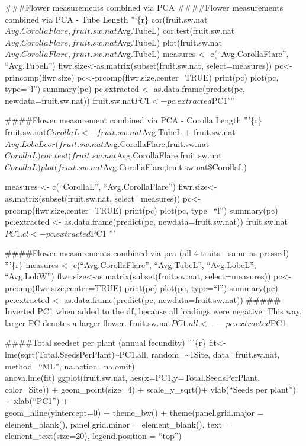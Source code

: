 \documentclass[]{article}
\begin{document}
\#\#\#Flower measurements combined via PCA \#\#\#\#Flower measurements
combined via PCA - Tube Length ''`\{r\}
cor(fruit.sw.nat\(Avg.CorollaFlare,fruit.sw.nat\)Avg.TubeL)
cor.test(fruit.sw.nat\(Avg.CorollaFlare,fruit.sw.nat\)Avg.TubeL)
plot(fruit.sw.nat\(Avg.CorollaFlare,fruit.sw.nat\)Avg.TubeL) measures
\textless{}- c(``Avg.CorollaFlare'', ``Avg.TubeL'')
flwr.size\textless{}-as.matrix(subset(fruit.sw.nat, select=measures))
pc\textless{}-princomp(flwr.size)
pc\textless{}-prcomp(flwr.size,center=TRUE) print(pc) plot(pc,
type=``l'') summary(pc) pc.extracted \textless{}-
as.data.frame(predict(pc, newdata=fruit.sw.nat))
fruit.sw.nat\(PC1 <- pc.extracted\)PC1'''

\#\#\#\#Flower measurement combined via PCA - Corolla Length '''\{r\}
fruit.sw.nat\(CorollaL <- fruit.sw.nat\)Avg.TubeL +
fruit.sw.nat\(Avg.LobeL cor(fruit.sw.nat\)Avg.CorollaFlare,fruit.sw.nat\(CorollaL) cor.test(fruit.sw.nat\)Avg.CorollaFlare,fruit.sw.nat\(CorollaL) plot(fruit.sw.nat\)Avg.CorollaFlare,fruit.sw.nat\$CorollaL)

measures \textless{}- c(``CorollaL'', ``Avg.CorollaFlare'')
flwr.size\textless{}-as.matrix(subset(fruit.sw.nat, select=measures))
pc\textless{}-prcomp(flwr.size,center=TRUE) print(pc) plot(pc,
type=``l'') summary(pc) pc.extracted \textless{}-
as.data.frame(predict(pc, newdata=fruit.sw.nat))
fruit.sw.nat\(PC1.cl <- pc.extracted\)PC1 '''

\#\#\#\#Flower measurements combined via pca (all 4 traits - same as
pressed) '''\{r\} measures \textless{}- c(``Avg.CorollaFlare'',
``Avg.TubeL'', ``Avg.LobeL'', ``Avg.LobW'')
flwr.size\textless{}-as.matrix(subset(fruit.sw.nat, select=measures))
pc\textless{}-prcomp(flwr.size,center=TRUE) print(pc) plot(pc,
type=``l'') summary(pc) pc.extracted \textless{}-
as.data.frame(predict(pc, newdata=fruit.sw.nat)) \#\#\#\#\# Inverted PC1
when added to the df, because all loadings were negative. This way,
larger PC denotes a larger flower.
fruit.sw.nat\(PC1.all <- -pc.extracted\)PC1

\#\#\#\#Total seedset per plant (annual fecundity) '''\{r\}
fit\textless{}-lme(sqrt(Total.SeedsPerPlant)\textasciitilde{}PC1.all,
random=\textasciitilde{}1\textbar{}Site, data=fruit.sw.nat,
method=``ML'', na.action=na.omit)\\
anova.lme(fit) ggplot(fruit.sw.nat, aes(x=PC1,y=Total.SeedsPerPlant,
color=Site)) + geom\_point(size=4) + scale\_y\_sqrt()+ ylab(``Seeds per
plant'') + xlab(``PC1'') +\\
geom\_hline(yintercept=0) + theme\_bw() + theme(panel.grid.major =
element\_blank(), panel.grid.minor = element\_blank(), text =
element\_text(size=20), legend.position = ``top'')
\end{document}
